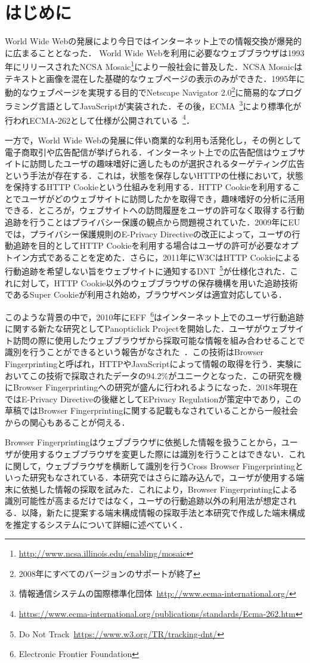 \section{はじめに}
World Wide Webの発展により今日ではインターネット上での情報交換が爆発的に広まることとなった． World Wide Webを利用に必要なウェブブラウザは1993年にリリースされたNCSA Mosaic\footnote{\url{http://www.ncsa.illinois.edu/enabling/mosaic}}により一般社会に普及した．NCSA Mosaicはテキストと画像を混在した基礎的なウェブページの表示のみができた．1995年に動的なウェブページを実現する目的でNetscape Navigator 2.0\footnote{2008年にすべてのバージョンのサポートが終了}に簡易的なプログラミング言語としてJavaScriptが実装された．その後，ECMA~\footnote{情報通信システムの国際標準化団体~\url{http://www.ecma-international.org/}}により標準化が行われECMA-262として仕様が公開されている~\footnote{\url{https://www.ecma-international.org/publications/standards/Ecma-262.htm}}．

一方で，World Wide Webの発展に伴い商業的な利用も活発化し，その例として電子商取引や広告配信が挙げられる．インターネット上での広告配信はウェブサイトに訪問したユーザの趣味嗜好に適したものが選択されるターゲティング広告という手法が存在する．これは，状態を保存しないHTTPの仕様において，状態を保持するHTTP Cookieという仕組みを利用する．HTTP Cookieを利用することでユーザがどのウェブサイトに訪問したかを取得でき，趣味嗜好の分析に活用できる．ところが，ウェブサイトへの訪問履歴をユーザの許可なく取得する行動追跡を行うことはプライバシー保護の観点から問題視されていた．2009年にEUでは，プライバシー保護規則のE-Privacy Directiveの改正によって，ユーザの行動追跡を目的としてHTTP Cookieを利用する場合はユーザの許可が必要なオプトイン方式であることを定めた．さらに，2011年にW3CはHTTP Cookieによる行動追跡を希望しない旨をウェブサイトに通知するDNT~\footnote{Do Not Track~\url{https://www.w3.org/TR/tracking-dnt/}}が仕様化された．これに対して，HTTP Cookie以外のウェブブラウザの保存機構を用いた追跡技術であるSuper Cookieが利用され始め，ブラウザベンダは適宜対応している． 

このような背景の中で，2010年にEFF~\footnote{Electronic Frontier Foundation}はインターネット上でのユーザ行動追跡に関する新たな研究としてPanopticlick Projectを開始した．ユーザがウェブサイト訪問の際に使用したウェブブラウザから採取可能な情報を組み合わせることで識別を行うことができるという報告がなされた~\cite{eckersley2010unique}．この技術はBrowser Fingerprintingと呼ばれ，HTTPやJavaScriptによって情報の取得を行う．実験においてこの技術で採取されたデータの94.2\%がユニークとなった．この研究を機にBrowser Fingerprintingへの研究が盛んに行われるようになった．2018年現在ではE-Privacy Directiveの後継としてEPrivacy Regulationが策定中であり，この草稿ではBrowser Fingerprintingに関する記載もなされていることから一般社会からの関心もあることが伺える．

Browser Fingerprintingはウェブブラウザに依拠した情報を扱うことから，ユーザが使用するウェブブラウザを変更した際には識別を行うことはできない．これに関して，ウェブブラウザを横断して識別を行うCross Browser Fingerprintingといった研究もなされている．本研究ではさらに踏み込んで，ユーザが使用する端末に依拠した情報の採取を試みた．これにより，Browser Fingerprintingによる識別可能性が高まるだけではなく，ユーザの行動追跡以外の利用法が想定される．以降，新たに提案する端末構成情報の採取手法と本研究で作成した端末構成を推定するシステムについて詳細に述べていく．
